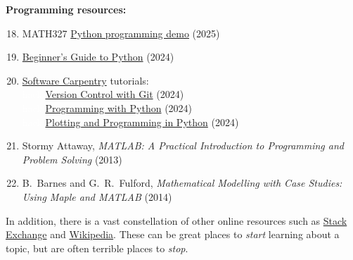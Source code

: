 \noindent\textbf{Programming resources:} \\[-24 pt]
\begin{enumerate}
  \setcounter{enumi}{17}
  \item MATH327 \href{https://tinyurl.com/math327demo}{Python programming demo} (2025)
  \item \href{https://wiki.python.org/moin/BeginnersGuide}{Beginner's Guide to Python} (2024)
  \item \href{https://software-carpentry.org}{Software Carpentry} tutorials: \\
        \textcolor{white}{hack} \href{https://swcarpentry.github.io/git-novice/}{Version Control with Git} (2024) \\
        \textcolor{white}{hack} \href{https://swcarpentry.github.io/python-novice-inflammation/}{Programming with Python} (2024) \\
        \textcolor{white}{hack} \href{https://swcarpentry.github.io/python-novice-gapminder/}{Plotting and Programming in Python} (2024)
  \item Stormy Attaway, \textit{MATLAB: A Practical Introduction to Programming and Problem Solving} (2013)
  \item B.~Barnes and G.~R.~Fulford, \textit{Mathematical Modelling with Case Studies: Using Maple and MATLAB} (2014)
\end{enumerate}

In addition, there is a vast constellation of other online resources such as \href{https://physics.stackexchange.com/questions/tagged/statistical-mechanics}{Stack Exchange} and \href{https://en.wikipedia.org/wiki/Statistical_physics}{Wikipedia}.
These can be great places to \emph{start} learning about a topic, but are often terrible places to \emph{stop}.
